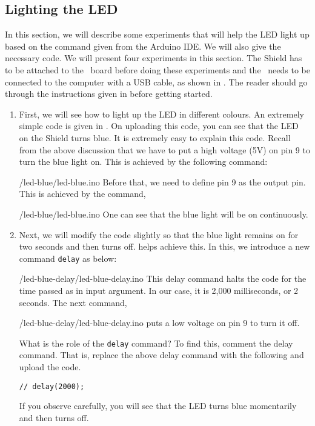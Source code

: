 \subsection{Lighting the LED}
\label{sec:light-ard}
In this section, we will describe some experiments that will help the
LED light up based on the command given from the Arduino IDE.  We will
also give the necessary code.  We will present four experiments in
this section.  The Shield has to be attached to the \arduino\ board
before doing these experiments and the \arduino\ needs to be connected to the computer 
with a USB cable, as shown in . The reader should go through the
instructions given in  before getting started.
\begin{enumerate}
  \item First, we will see how to light up the LED in different
        colours.  An extremely simple code is given in .
        On uploading this code, you can see that the LED on the Shield turns
        blue.  It is extremely easy to explain this code.  Recall from the
        above discussion that we have to put a high voltage (5V) on pin 9 to
        turn the blue light on.  This is achieved by the following command:
        
        {\LocLEDardcode/led-blue/led-blue.ino}
        Before that, we need to define pin 9 as the
        output pin.  This is achieved by the command,
        
        {\LocLEDardcode/led-blue/led-blue.ino}
        One can see that the blue light will be on continuously.  
        
  \item Next, we will modify the code slightly so that the blue light
        remains on for two seconds and then turns off.
         helps achieve this.  In this, we
        introduce a new command {\tt delay} as below:
        
        {\LocLEDardcode/led-blue-delay/led-blue-delay.ino} This delay
        command halts the code for the time passed as in input argument. In
        our case, it is 2,000 milliseconds, or 2 seconds.  The next command,
        
        {\LocLEDardcode/led-blue-delay/led-blue-delay.ino} puts a low
        voltage on pin 9 to turn it off.
        
        What is the role of the {\tt delay} command?  To find this,
        comment the delay command.  That is, replace the above delay command
        with the following and upload the code.
        \begin{lstlisting}[style=nonumbers]
    // delay(2000);
  \end{lstlisting}
        If you observe carefully, you will see that the LED turns blue
        momentarily and then turns off.
        

\end{enumerate}

